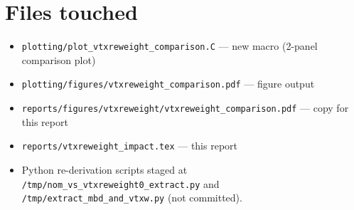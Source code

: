 \documentclass[11pt,a4paper]{article}
\begin{document}
\section*{Files touched}
\begin{itemize}
\item \texttt{plotting/plot\_vtxreweight\_comparison.C} --- new macro (2-panel comparison plot)
\item \texttt{plotting/figures/vtxreweight\_comparison.pdf} --- figure output
\item \texttt{reports/figures/vtxreweight/vtxreweight\_comparison.pdf} --- copy for this report
\item \texttt{reports/vtxreweight\_impact.tex} --- this report
\item Python re-derivation scripts staged at \texttt{/tmp/nom\_vs\_vtxreweight0\_extract.py} and \texttt{/tmp/extract\_mbd\_and\_vtxw.py} (not committed).
\end{itemize}
\end{document}
